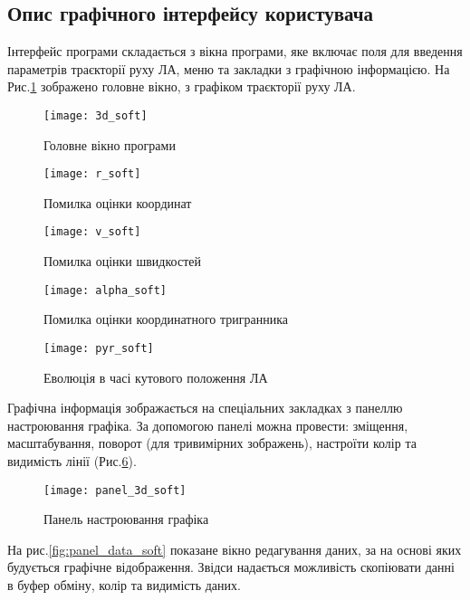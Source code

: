 \subsection{Опис графічного інтерфейсу користувача}

Інтерфейс програми складається з вікна програми, яке включає поля для введення параметрів траєкторії руху ЛА, меню та закладки з графічною інформацією. На Рис.\ref{fig:3d_soft} зображено головне вікно, з графіком траєкторії руху ЛА.

\begin{figure}[H]
\centering
\texttt{[image: 3d\_soft]}
\caption{Головне вікно програми}\label{fig:3d_soft}
\end{figure}

\begin{figure}[H]
\centering
\texttt{[image: r\_soft]}
\caption{Помилка оцінки координат}\label{fig:r_soft}
\end{figure}

\begin{figure}[H]
\centering
\texttt{[image: v\_soft]}
\caption{Помилка оцінки швидкостей}\label{fig:v_soft}
\end{figure}

\begin{figure}[h!]
\centering
\texttt{[image: alpha\_soft]}
\caption{Помилка оцінки координатного тригранника}\label{fig:alpha_soft}
\end{figure}


\begin{figure}[h!]
\centering
\texttt{[image: pyr\_soft]}
\caption{Еволюція в часі кутового положення ЛА}\label{fig:pyr_soft}
\end{figure}


Графічна інформація зображається на спеціальних закладках з панеллю настроювання графіка. За допомогою панелі можна провести: зміщення, масштабування, поворот (для тривимірних зображень), настроїти колір та видимість лінії (Рис.\ref{fig:panel_3d_soft}).

\begin{figure}[h!]
\centering
\texttt{[image: panel\_3d\_soft]}
\caption{Панель настроювання графіка}\label{fig:panel_3d_soft}
\end{figure}

На рис.\ref{fig:panel_data_soft} показане вікно редагування даних, за на основі яких будується графічне відображення. Звідси надається можливість скопіювати данні в буфер обміну, колір та видимість даних.

